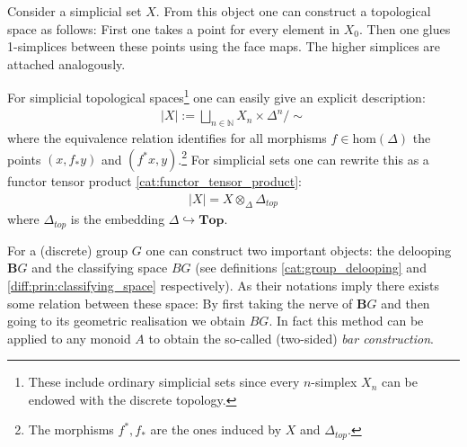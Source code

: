     \begin{example}
        Consider a simplicial set $X$. From this object one can construct a topological space as follows: First one takes a point for every element in $X_0$. Then one glues 1-simplices between these points using the face maps. The higher simplices are attached analogously.

        For simplicial topological spaces\footnote{These include ordinary simplicial sets since every $n$-simplex $X_n$ can be endowed with the discrete topology.} one can easily give an explicit description:
        \begin{gather}
            |X| := \bigsqcup_{n\in\mathbb{N}}X_n\times\Delta^n / \sim
        \end{gather}
        where the equivalence relation identifies for all morphisms $f\in\text{hom}(\Delta)$ the points $(x, f_*y)$ and $(f^*x, y)$.\footnote{The morphisms $f^*, f_*$ are the ones induced by $X$ and $\Delta_{top}$.} For simplicial sets one can rewrite this as a functor tensor product \ref{cat:functor_tensor_product}:
        \begin{gather}
            |X| = X\otimes_{\Delta}\Delta_{top}
        \end{gather}
        where $\Delta_{top}$ is the embedding $\Delta\hookrightarrow\mathbf{Top}$.
    \end{example}

    \begin{property}
        For a (discrete) group $G$ one can construct two important objects: the delooping $\mathbf{B}G$ and the classifying space $BG$ (see definitions \ref{cat:group_delooping} and \ref{diff:prin:classifying_space} respectively). As their notations imply there exists some relation between these space: By first taking the nerve of $\mathbf{B}G$ and then going to its geometric realisation we obtain $BG$. In fact this method can be applied to any monoid $A$ to obtain the so-called (two-sided) \textit{bar construction}.
    \end{property}

